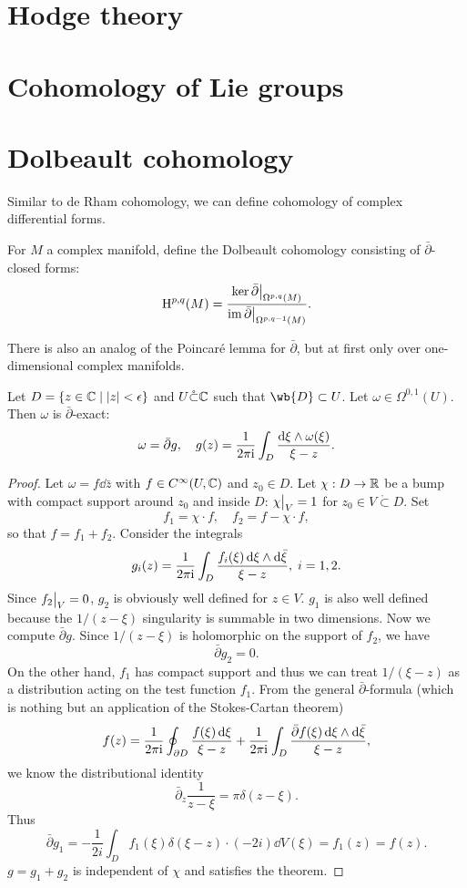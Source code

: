 \section{Hodge theory}


\section{Cohomology of Lie groups}


\section{Dolbeault cohomology}

Similar to de Rham cohomology, we can define cohomology of complex differential forms.

\begin{defn}
    For $M$ a complex manifold, define the Dolbeault cohomology consisting of $\bar\partial$-closed forms:
    \[\rmH^{p,q}(M)=\frac{\ker \restr{\bar\partial}{\Omega^{p,q}(M)}}{\restr{\im\bar\partial}{\Omega^{p,q-1}(M)}}.\]
\end{defn}

There is also an analog of the Poincar\'e lemma for $\bar\partial$, but at first only over one-dimensional complex manifolds.

\begin{lem}
    Let $D=\{z\in\mathbb{C}\mid |z|<\epsilon\}$ and $U\mathring\subset \mathbb{C}$ such that $\wb{D}\subset U$. Let $\omega\in \Omega^{0,1}(U)$. Then $\omega$ is $\bar\partial$-exact:
    \[\omega=\bar\partial g,\quad g(z)=\frac{1}{2\pi\mathrm{i} }\int_{D}\frac{\mathop{}\!\mathrm{d}\xi\wedge \omega(\xi)}{\xi-z}.\]
\end{lem}
\begin{proof}
    Let $\omega=f\dd\bar z$ with $f\in C^\infty(U,\mathbb{C})$ and $z_0\in D$. Let $\chi:D\to\mathbb{R}$ be a bump with compact support around $z_0$ and inside $D$: $\restr{\chi}{V}=1$ for $z_0\in V\mathring\subset D$. Set
    \[f_1=\chi\cdot f,\quad f_2=f-\chi\cdot f,\]
    so that $f=f_1+f_2$. Consider the integrals
    \[g_i(z)=\frac{1}{2\pi\mathrm{i} }\int_{D}\frac{f_i(\xi)\mathop{}\!\mathrm{d}\xi\wedge \mathop{}\!\mathrm{d}\bar\xi}{\xi-z},\; i=1,2.\]
    Since $\restr{f_2}{V}=0$, $g_2$ is obviously well defined for $z\in V$. $g_1$ is also well defined because the $1/(z-\xi)$ singularity is summable in two dimensions. Now we compute $\bar\partial g$. Since $1/(z-\xi)$ is holomorphic on the support of $f_2$, we have
    \[\bar\partial g_2=0.\]
    On the other hand, $f_1$ has compact support and thus we can treat $1/(\xi-z)$ as a distribution acting on the test function $f_1$. From the general $\bar\partial$-formula (which is nothing but an application of the Stokes-Cartan theorem)
    \[f(z)=\frac{1}{2\pi\mathrm{i} }\oint_{\partial D}\frac{f(\xi)\mathop{}\!\mathrm{d}\xi}{\xi-z}+\frac{1}{2\pi\mathrm{i} }\int_D\frac{\bar\partial f(\xi)\mathop{}\!\mathrm{d}\xi\wedge\mathop{}\!\mathrm{d}\bar \xi}{\xi-z},\]
    we know the distributional identity
    \[\bar\partial_z \frac{1}{z-\xi}=\pi\delta(z-\xi).\]
    Thus 
    \[\bar\partial g_1=-\frac{1}{2 i}\int_D f_1(\xi)\delta(\xi-z)\cdot (-2i)\dd V(\xi)=f_1(z)=f(z).\]
    $g=g_1+g_2$ is independent of $\chi$ and satisfies the theorem.
\end{proof}

